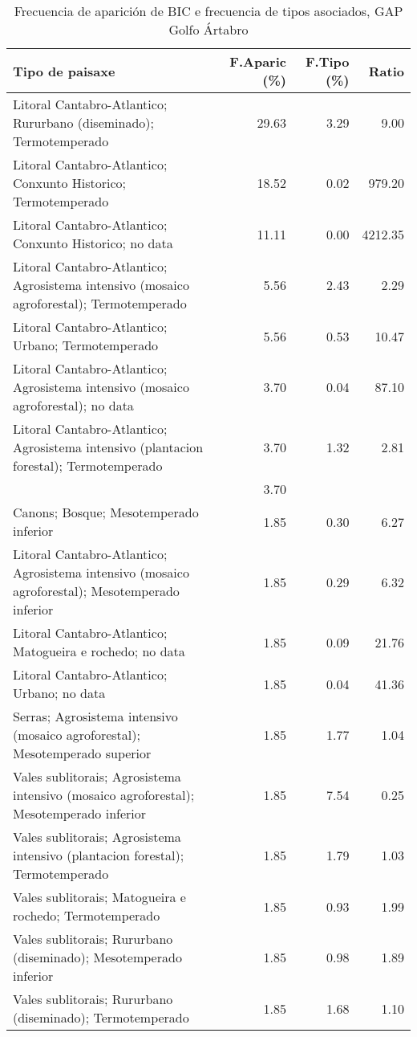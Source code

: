 \begin{table}[p]
\centering
\caption{Frecuencia de aparición de BIC e frecuencia de tipos asociados, GAP Golfo Ártabro} 
\label{vbic1}
\begin{tabular}{lrrr}
  \hline
Tipo de paisaxe & F.Aparic (\%) & F.Tipo (\%) & Ratio \\ 
  \hline
Litoral Cantabro-Atlantico; Rururbano (diseminado); Termotemperado & 29.63 & 3.29 & 9.00 \\ 
  Litoral Cantabro-Atlantico; Conxunto Historico; Termotemperado & 18.52 & 0.02 & 979.20 \\ 
  Litoral Cantabro-Atlantico; Conxunto Historico; no data & 11.11 & 0.00 & 4212.35 \\ 
  Litoral Cantabro-Atlantico; Agrosistema intensivo (mosaico agroforestal); Termotemperado & 5.56 & 2.43 & 2.29 \\ 
  Litoral Cantabro-Atlantico; Urbano; Termotemperado & 5.56 & 0.53 & 10.47 \\ 
  Litoral Cantabro-Atlantico; Agrosistema intensivo (mosaico agroforestal); no data & 3.70 & 0.04 & 87.10 \\ 
  Litoral Cantabro-Atlantico; Agrosistema intensivo (plantacion forestal); Termotemperado & 3.70 & 1.32 & 2.81 \\ 
   & 3.70 &  &  \\ 
  Canons; Bosque; Mesotemperado inferior & 1.85 & 0.30 & 6.27 \\ 
  Litoral Cantabro-Atlantico; Agrosistema intensivo (mosaico agroforestal); Mesotemperado inferior & 1.85 & 0.29 & 6.32 \\ 
  Litoral Cantabro-Atlantico; Matogueira e rochedo; no data & 1.85 & 0.09 & 21.76 \\ 
  Litoral Cantabro-Atlantico; Urbano; no data & 1.85 & 0.04 & 41.36 \\ 
  Serras; Agrosistema intensivo (mosaico agroforestal); Mesotemperado superior & 1.85 & 1.77 & 1.04 \\ 
  Vales sublitorais; Agrosistema intensivo (mosaico agroforestal); Mesotemperado inferior & 1.85 & 7.54 & 0.25 \\ 
  Vales sublitorais; Agrosistema intensivo (plantacion forestal); Termotemperado & 1.85 & 1.79 & 1.03 \\ 
  Vales sublitorais; Matogueira e rochedo; Termotemperado & 1.85 & 0.93 & 1.99 \\ 
  Vales sublitorais; Rururbano (diseminado); Mesotemperado inferior & 1.85 & 0.98 & 1.89 \\ 
  Vales sublitorais; Rururbano (diseminado); Termotemperado & 1.85 & 1.68 & 1.10 \\ 
   \hline
\end{tabular}
\end{table}
